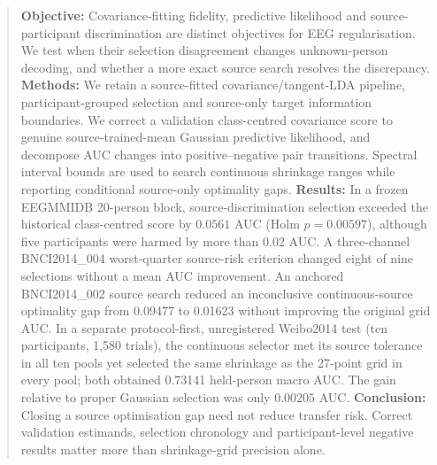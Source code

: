 \begin{abstract}
\textbf{Objective:} Covariance-fitting fidelity,
predictive likelihood and source-participant
discrimination are distinct objectives for
EEG regularisation. We test when their
selection disagreement changes unknown-person
decoding, and whether a more exact source
search resolves the discrepancy.
\textbf{Methods:} We retain a source-fitted
covariance/tangent-LDA pipeline, participant-grouped
selection and source-only target information
boundaries. We correct a validation class-centred
covariance score to genuine source-trained-mean
Gaussian predictive likelihood, and decompose
AUC changes into positive--negative pair transitions.
Spectral interval bounds are used to search
continuous shrinkage ranges while reporting
conditional source-only optimality gaps.
\textbf{Results:} In a frozen EEGMMIDB
20-person block, source-discrimination selection
exceeded the historical class-centred score
by $0.0561$ AUC (Holm $p=0.00597$), although
five participants were harmed by more than
0.02 AUC. A three-channel BNCI2014\_004
worst-quarter source-risk criterion changed
eight of nine selections without a mean
AUC improvement. An anchored BNCI2014\_002
source search reduced an inconclusive
continuous-source optimality gap from
0.09477 to 0.01623 without improving
the original grid AUC. In a separate
protocol-first, unregistered Weibo2014
test (ten participants, 1,580 trials),
the continuous selector met its source
tolerance in all ten pools yet selected
the same shrinkage as the 27-point grid
in every pool; both obtained
0.73141 held-person macro AUC.
The gain relative to proper Gaussian
selection was only $0.00205$ AUC.
\textbf{Conclusion:} Closing a source
optimisation gap need not reduce transfer
risk. Correct validation estimands,
selection chronology and participant-level
negative results matter more than
shrinkage-grid precision alone.
\end{abstract}
